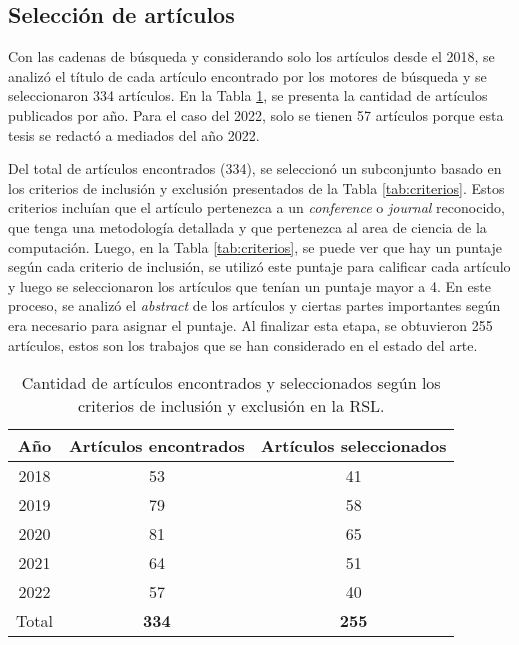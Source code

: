 \subsection{Selección de artículos}

Con las cadenas de búsqueda y considerando solo los artículos desde el 2018, se analizó el título de cada artículo encontrado por los motores de búsqueda y se seleccionaron 334 artículos. En la Tabla \ref{tab:number_papers}, se presenta la cantidad de artículos publicados por año. Para el caso del 2022, solo se tienen 57 artículos porque esta tesis se redactó a mediados del año 2022. 

Del total de artículos encontrados (334), se seleccionó un subconjunto basado en los criterios de inclusión y exclusión presentados de la Tabla  \ref{tab:criterios}. Estos criterios incluían que el artículo pertenezca a un \textit{conference} o \textit{journal} reconocido, que tenga una metodología detallada y que pertenezca al area de ciencia de la computación. Luego, en la Tabla \ref{tab:criterios}, se puede ver que hay un puntaje según cada criterio de inclusión, se utilizó este puntaje para calificar cada artículo y luego se seleccionaron los artículos que tenían un puntaje mayor a 4. En este proceso, se analizó el \textit{abstract} de los artículos y ciertas partes importantes según era necesario para asignar el puntaje. Al finalizar esta etapa, se obtuvieron 255 artículos, estos son los trabajos que se han considerado en el estado del arte.




\begin{table}[H]
	\begin{center}
		\caption{Cantidad de artículos encontrados y seleccionados según los criterios de inclusión y exclusión en la RSL.}
		\label{tab:number_papers}
		\setlength{\tabcolsep}{0.5em} %
		{\renewcommand{\arraystretch}{1.2}%
			\begin{tabular}{ccc}
					\textbf{Año} & \textbf{Artículos encontrados} & \textbf{Artículos seleccionados}\\ \hline
				    2018 & 53 & 41 \\
				    2019 & 79 & 58 \\
				    2020 & 81 & 65 \\
				    2021 & 64 & 51 \\
				    2022 & 57 & 40 \\ \hline
				    Total & \textbf{334} & \textbf{255} \\
			\end{tabular}
		}
	\end{center}
\end{table}


